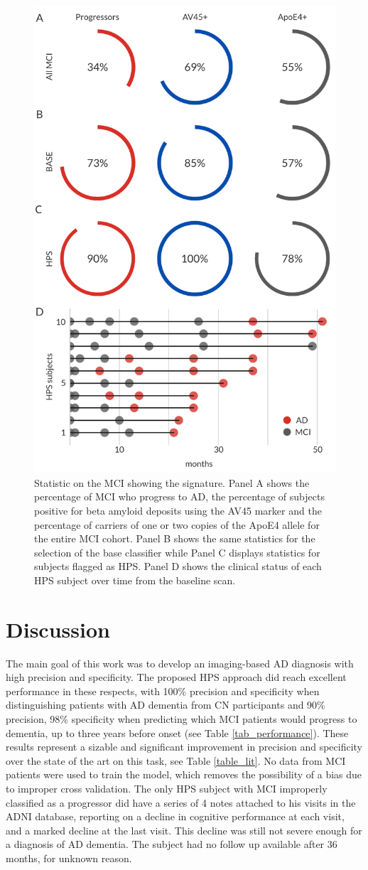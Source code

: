 \documentclass[authoryear]{elsarticle}
\begin{document}
\begin{figure}[htbp]%
\centering
\includegraphics[width=0.6\linewidth]{figures/progressors.png}
\caption{Statistic on the MCI showing the signature. Panel A shows the percentage of MCI who progress to AD, the percentage of subjects positive for beta amyloid deposits using the AV45 marker and the percentage of carriers of one or two copies of the ApoE4 allele for the entire MCI cohort. Panel B shows the same statistics for the selection of the base classifier while Panel C displays statistics for subjects flagged as HPS. Panel D shows the clinical status of each HPS subject over time from the baseline scan.}
\label{fig_progressors}
\end{figure}

\section{Discussion}

The main goal of this work was to develop an imaging-based AD diagnosis with high precision and specificity. The proposed HPS approach did reach excellent performance in these respects, with 100\% precision and specificity when distinguishing patients with AD dementia from CN participants and 90\% precision, 98\% specificity when predicting which MCI patients would progress to dementia, up to three years before onset (see Table \ref{tab_performance}). These results represent a sizable and significant improvement in precision and specificity over the state of the art on this task, see Table \ref{table_lit}. No data from MCI patients were used to train the model, which removes the possibility of a bias due to improper cross validation. The only HPS subject with MCI improperly classified as a progressor did have a series of 4 notes attached to his visits in the ADNI database, reporting on a decline in cognitive performance at each visit, and a marked decline at the last visit. This decline was still not severe enough for a diagnosis of AD dementia. The subject had no follow up available after 36 months, for unknown reason.
\end{document}
